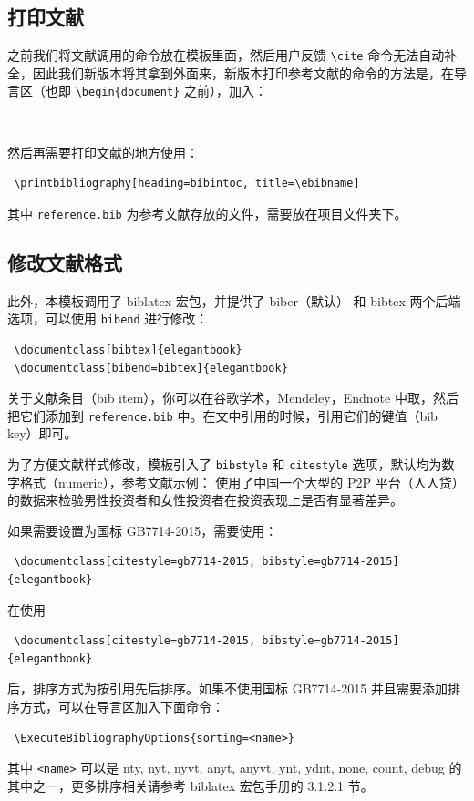 \documentclass[lang=cn,newtx,10pt,scheme=chinese,pad,twocol]{zznote}
\begin{document}
\subsection{打印文献}

之前我们将文献调用的命令放在模板里面，然后用户反馈 \lstinline{\cite} 命令无法自动补全，因此我们新版本将其拿到外面来，新版本打印参考文献的命令的方法是，在导言区（也即 \lstinline|\begin{document}| 之前），加入：

\begin{lstlisting}
 
\end{lstlisting}

然后再需要打印文献的地方使用：
\begin{lstlisting}
 \printbibliography[heading=bibintoc, title=\ebibname]
\end{lstlisting}

其中 \lstinline{reference.bib} 为参考文献存放的文件，需要放在项目文件夹下。

\subsection{修改文献格式}

此外，本模板调用了 biblatex 宏包，并提供了 biber（默认） 和 bibtex 两个后端选项，可以使用 \lstinline{bibend} 进行修改：

\begin{lstlisting}
 \documentclass[bibtex]{elegantbook}
 \documentclass[bibend=bibtex]{elegantbook}
\end{lstlisting}

关于文献条目（bib item），你可以在谷歌学术，Mendeley，Endnote 中取，然后把它们添加到 \lstinline{reference.bib} 中。在文中引用的时候，引用它们的键值（bib key）即可。

为了方便文献样式修改，模板引入了 \lstinline{bibstyle} 和 \lstinline{citestyle} 选项，默认均为数字格式（numeric），参考文献示例：\cite{cn1,en2,en3} 使用了中国一个大型的 P2P 平台（人人贷）的数据来检验男性投资者和女性投资者在投资表现上是否有显著差异。

如果需要设置为国标 GB7714-2015，需要使用：
\begin{lstlisting}
 \documentclass[citestyle=gb7714-2015, bibstyle=gb7714-2015]{elegantbook} 
\end{lstlisting}

在使用
\begin{lstlisting}
 \documentclass[citestyle=gb7714-2015, bibstyle=gb7714-2015]{elegantbook} 
\end{lstlisting}
后，排序方式为按引用先后排序。如果不使用国标 GB7714-2015 并且需要添加排序方式，可以在导言区加入下面命令：
\begin{lstlisting}
 \ExecuteBibliographyOptions{sorting=<name>}
\end{lstlisting}
其中 \lstinline{<name>} 可以是 nty, nyt, nyvt, anyt, anyvt, ynt, ydnt, none, count, debug 的其中之一，更多排序相关请参考 biblatex 宏包手册的 3.1.2.1 节。
\end{document}
